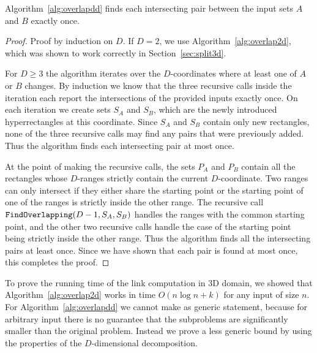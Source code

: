 \documentclass[english,gradu]{tktltiki2018}
\begin{document}
\begin{lem}\label{lem:overlapddok}
Algorithm~\ref{alg:overlapdd} finds each intersecting pair between the input sets $A$ and $B$ exactly once.
\end{lem}
\begin{proof}
Proof by induction on $D$.
If $D=2$, we use Algorithm~\ref{alg:overlap2d}, which was shown to work correctly in Section~\ref{sec:split3d}.

For $D\ge 3$ the algorithm iterates over the $D$-coordinates where at least one of $A$ or $B$ changes.
By induction we know that the three recursive calls inside the iteration each report the intersections of the provided inputs exactly once.
On each iteration we create sets $S_A$ and $S_B$, which are the newly introduced hyperrectangles at this coordinate.
Since $S_A$ and $S_B$ contain only new rectangles, none of the three recursive calls may find any pairs that were previously added.
Thus the algorithm finds each intersecting pair at most once.

At the point of making the recursive calls, the sets $P_A$ and $P_B$ contain all the rectangles whose $D$-ranges strictly contain the current $D$-coordinate.
Two ranges can only intersect if they either share the starting point or the starting point of one of the ranges is strictly inside the other range.
The recursive call $\texttt{FindOverlapping}(D-1,S_A,S_B)$ handles the ranges with the common starting point, and the other two recursive calls handle the case of the starting point being strictly inside the other range.
Thus the algorithm finds all the intersecting pairs at least once.
Since we have shown that each pair is found at most once, this completes the proof.
\end{proof}

To prove the running time of the link computation in 3D domain, we showed that Algorithm~\ref{alg:overlap2d} works in time $O(n\log n+k)$ for any input of size $n$.
For Algorithm~\ref{alg:overlapdd} we cannot make as generic statement, because for arbitrary input there is no guarantee that the subproblems are significantly smaller than the original problem.
Instead we prove a less generic bound by using the properties of the $D$-dimensional decomposition.
\end{document}
